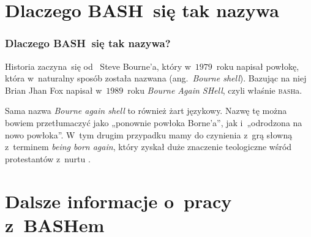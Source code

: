 \documentclass[10pt,t]{beamer}
\begin{document}
\appendix















\section{Dlaczego BASH~się tak nazywa}



\begin{frame}
  \frametitle{Dlaczego BASH~się tak nazywa?}


  Historia zaczyna~się
  od~
  {Steve Bourne’a}, który w~$1979$~roku napisał powłokę, która w~naturalny
  sposób została nazwana
  (ang.~\textit{Bourne shell}). Bazując na niej
  {Brian Jhan Fox} napisał w~$1989$~roku \textit{Bourne Again SHell},
  czyli właśnie
  {\textsc{bash}a}.

  Sama nazwa \textit{Bourne again shell} to również żart językowy. Nazwę tę
  można bowiem przetłumaczyć jako „ponownie powłoka Borne’a”, jak
  i~„odrodzona na nowo powłoka”. W~tym drugim przypadku mamy do czynienia
  z~grą słowną z~terminem
  {\textit{being born again}}, który zyskał
  duże znaczenie teologiczne wśród protestantów z~nurtu
  .

\end{frame}





\section{Dalsze informacje o~pracy z~BASHem}
\end{document}
